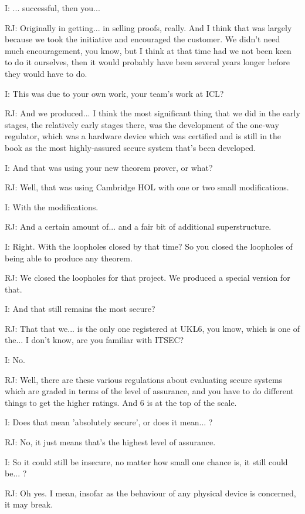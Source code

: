 \documentclass[10pt,titlepage]{book}
\begin{document}
I: ... successful, then you...

RJ: Originally in getting... in selling proofs, really. And I think that was largely because we took the initiative and encouraged the customer. We didn't need much encouragement, you know, but I think at that time had we not been keen to do it ourselves, then it would probably have been several years longer before they would have	to do.

I: This was due to your own work, your team's work at ICL?

RJ: And we produced... I think the most significant thing that we did in the early stages, the relatively early stages there, was the development of the one-way regulator, which was a hardware device which was 	certified and is still in the book as the most highly-assured secure system that's been developed.

I: And that was using your new theorem prover, or what?

RJ: Well, that was using Cambridge HOL with one or two small modifications.

I: With the modifications.

RJ: And a certain amount of... and a fair bit of additional superstructure.

I: Right. With the loopholes closed by that time? So you closed the loopholes of being able to produce any theorem.

RJ: We closed the loopholes for that project. We produced a special version for that.

I: And that still remains the most secure?

RJ: That 	that we... is the only one registered at UKL6, you know, which is one of the... I don't know, are you familiar with ITSEC?

I: No.

RJ: Well, there are these various regulations about evaluating secure systems which are graded in terms of the level of assurance, and you have to do different things to get the higher ratings. And 6 is at the top of the scale.

I: Does that mean 'absolutely secure', or does it mean... ?

RJ: No, it just means that's the highest level of assurance.

I: So it could still be insecure, no matter how small one chance is, it still could be... ?

RJ: Oh yes. I mean, insofar as the behaviour of any physical device is concerned, it may break.
\end{document}

